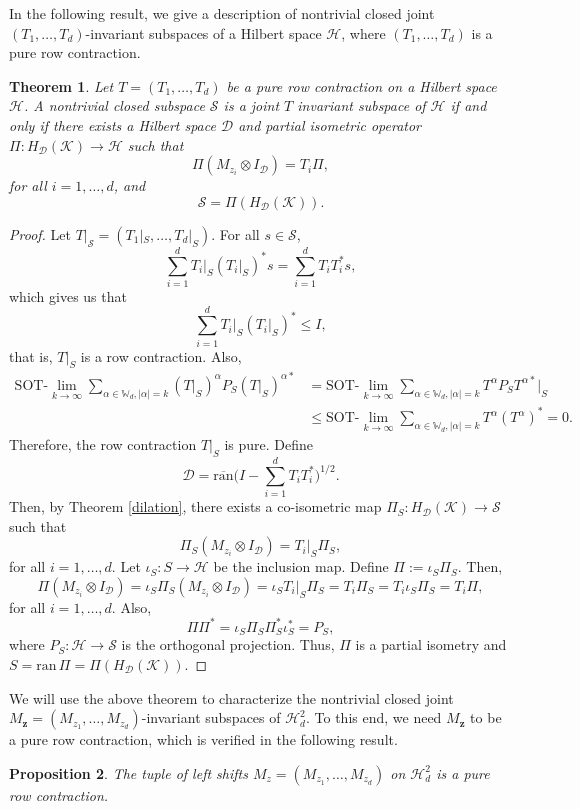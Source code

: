 \documentclass[12pt]{amsart}%
\newtheorem{theorem}{Theorem}[section]
\newtheorem{proposition}[theorem]{Proposition}
\numberwithin{equation}{section}
\newcommand{\bW}{\mathbb{W}}
\newcommand{\cld}{\mathcal{D}}
\newcommand{\clh}{\mathcal{H}}
\newcommand{\clk}{\mathcal{K}}
\newcommand{\cls}{\mathcal{S}}
\newcommand{\z}{\bm{z}}
\begin{document}
In the following result, we give a description of nontrivial  closed joint $(T_1,\ldots,T_d)$-invariant subspaces of a Hilbert space $\clh$, where $(T_1,\ldots,T_d)$ is a pure row contraction.
\begin{theorem}\label{description of S}
Let $T=(T_1,\ldots,T_d)$ be a pure row contraction on a Hilbert space $\clh$. A nontrivial closed subspace $\cls$ is a joint $T$ invariant subspace of $\clh$ if and only if there exists a Hilbert space $\cld$ and partial isometric operator $\Pi:H_{\cld}(\clk)\to\clh$ such that
\[
\Pi(M_{z_i}\otimes I_{\cld})=T_i\Pi,
\]
for all $i=1,\ldots,d$, and 
\[
\cls=\Pi(H_{\cld}(\clk)). 
\]
\end{theorem}
\begin{proof}
Let $T|_{\cls}=(T_1|_S,\ldots,T_d|_S)$. For all $s\in\cls$,
\[
\sum_{i=1}^dT_i|_S(T_i|_S)^*s=\sum_{i=1}^dT_iT_i^*s,
\]
which gives us that 
\[
\sum_{i=1}^dT_i|_S(T_i|_S)^*\leq I,
\]
that is, $T|_S$ is a row contraction. Also,
\begin{align*}
\text{SOT-}\lim_{k\to\infty}\sum_{\alpha\in\bW_d,|\alpha|=k}(T|_S)^{\alpha}P_S(T|_S)^{\alpha*}&=\text{SOT-}\lim_{k\to\infty}\sum_{\alpha\in\bW_d,|\alpha|=k}T^{\alpha}P_ST^{\alpha*}|_S\\&\leq \text{SOT-}\lim_{k\to\infty}\sum_{\alpha\in\bW_d,|\alpha|=k}T^{\alpha}(T^{\alpha})^*=0.
\end{align*}
Therefore, the row contraction $T|_S$ is pure. Define
\[
\cld=\overline{\text{ran}}\Big(I-\sum_{i=1}^d T_iT_i^*\Big)^{1/2}.
\]
Then, by Theorem \ref{dilation}, there exists a co-isometric map $\Pi_S:H_{\cld}(\clk)\to\cls$ such that
\[
\Pi_S(M_{z_i}\otimes I_{\cld})=T_i|_S\Pi_S,
\]
for all $i=1,\ldots,d$. Let $\iota_S:S\to\clh$ be the inclusion map. Define $\Pi:=\iota_S\Pi_S$. Then,
\[
\Pi(M_{z_i}\otimes I_{\cld})=\iota_S\Pi_S(M_{z_i}\otimes I_{\cld})=\iota_ST_i|_S\Pi_S=T_i\Pi_S=T_i\iota_S\Pi_S=T_i\Pi,
\]
for all $i=1,\ldots,d$. Also,
\[
\Pi\Pi^*=\iota_S\Pi_S\Pi_S^*\iota_S^*=P_S,
\]
where $P_S:\clh\to\cls$ is the orthogonal projection. Thus, $\Pi$ is a partial isometry and $S=\text{ran}\,\Pi=\Pi(H_{\cld}(\clk))$.
\end{proof}
We will use the above theorem to characterize the nontrivial closed joint  $M_{\z}=(M_{z_1},\ldots,M_{z_d})$-invariant subspaces of $\clh^2_d$. To this end, we need $M_{\z}$ to be a pure row contraction, which is verified in the following result.
\begin{proposition}\label{M_z_is_pure_row}
The tuple of left shifts $M_z=(M_{z_1},\ldots,M_{z_d})$ on $\clh^2_d$ is a pure row contraction. 
\end{proposition}
\end{document}
